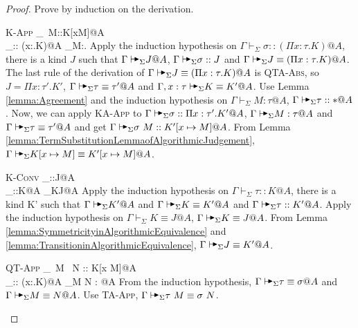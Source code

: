 \documentclass[9pt, a4paper]{extarticle}
\theoremstyle{break}
\newcommand{\G}{\Gamma}
\newcommand{\V}{\vdash_\Sigma}
\newcommand{\TB}{{\mathop{\blacktriangleright}}}
\newcommand{\E}{\equiv}
\newcommand{\KApp}{\textsc{K-App}\xspace}
\newcommand{\KConv}{\textsc{K-Conv}\xspace}
\newcommand{\KAApp}{\textsc{KA-App}\xspace}
\newcommand{\TAApp}{\textsc{TA-App}\xspace}
\newcommand{\QTApp}{\textsc{QT-App}\xspace}
\newcommand{\QTAAbs}{\textsc{QTA-Abs}\xspace}
\newcommand{\AV}{\vdash\!\!\!\raisebox{0.4ex}{\scalebox{0.7}{$\TB$}}}
\newcommand{\AVS}{\AV_\Sigma\xspace}
\begin{document}
\begin{proof}
    Prove by induction on the derivation.
    \begin{rneqncase}{\KApp}{
            \G\V \sigma\ M::K[x\mapsto M]@A \\
            \G\V \sigma:: (\Pi x:\tau.K)@A  \G\V M:\tau@A.
        }
        Apply the induction hypothesis on \( \G\V \sigma:: (\Pi x:\tau.K)@A \),
        there is a kind \( J \) such that \( \G\AVS J @A \), \( \G\AVS \sigma
        :: J \) and \( \G\AVS J \E (\Pi x:\tau.K)@A \).  The last rule of the
        derivation of \( \G\AVS J \E (\Pi x:\tau.K)@A \) is \QTAAbs, so \( J =
        \Pi x:\tau'.K' \), \( \G \AVS \tau \E \tau' @ A \) and \( \G, x:\tau
        \AVS K \E K' @ A \).  Use Lemma \ref{lemma:Agreement} and the induction
        hypothesis on \( \G \V M : \tau @ A \), \( \G \AVS \tau :: * @ A \).
        Now, we can apply \KAApp to \( \G \AVS \sigma :: \Pi x:\tau'.K' @ A \),
        \( \G \AVS M: \tau @ A \) and \( \G \AVS \tau \E \tau' @ A\) and get \(
        \G \AVS \sigma\ M :: K'[x \mapsto M] @ A \).  From Lemma
        \ref{lemma:TermSubstitutionLemmaofAlgorithmicJudgement}, \( \G \AVS K[x
        \mapsto M] \E K'[x \mapsto M] @ A \).
    \end{rneqncase}
    \begin{rneqncase}{\KConv}{
            \G\V \tau::J@A \\
            \G\V \tau::K@A 
            \G\V K\equiv J@A
        }
        Apply the induction hypothesis on \( \G\V \tau::K@A \),
        there is a kind K' such that \( \G \AVS K' @ A \) and 
        \( \G \AVS K\E K' @ A \) and \( \G\AVS \tau :: K' @ A \).
        Apply the induction hypothesis on \( \G\V K\equiv J@A \),
        \( \G\AVS K\equiv J@A \).
        From Lemma \ref{lemma:SymmetricityinAlgorithmicEquivalence} and
        \ref {lemma:TransitioninAlgorithmicEquivalence}, \( \G \AVS J \E K' @ A \).
    \end{rneqncase}
    \begin{rneqncase}{\QTApp}{
            \G\V \tau\ M \E \sigma\ N :: K[x \mapsto M]@A \\
            \G\V \tau \E \sigma :: (\Pi x:\rho.K)@A 
            \G\V M \E N : \rho @A
        }
        From the induction hypothesis, \( \G\AVS \tau \E \sigma@A \) and \(
        \G\AVS M \E N @A \). Use \TAApp, \( \G\AVS \tau\ M \E \sigma\ N \).
    \end{rneqncase}

\end{proof}
\end{document}
